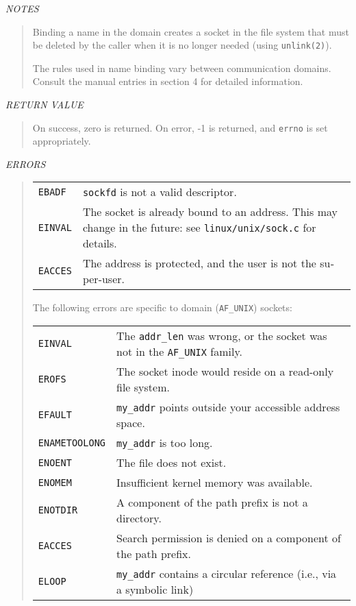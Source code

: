 \begin{appendix}
\begin{english}
{\sl NOTES}
\begin{quote}
	Binding a name in the {\Unix} domain creates a socket in the
	file system that must be deleted by the caller when it is
	no longer needed (using {\tt unlink(2)}).

	The rules used in name binding vary between communication
	domains. Consult the manual entries in section 4 for
	detailed information.
\end{quote}

{\sl RETURN VALUE}
\begin{quote}
	On success, zero is returned. On error, -1 is returned,
	and {\tt errno} is set appropriately.
\end{quote}

{\sl ERRORS}
\begin{quote}
\begin{tabular}{lp{8cm}}
	{\tt EBADF}		& {\tt sockfd} is not a valid descriptor.\\
	{\tt EINVAL}	& The socket is already bound to an address. This
				may change in the future: see {\tt linux/unix/sock.c}
				for details.\\
	{\tt EACCES}	& The address is protected, and the user is not the
				super-user.
\end{tabular}

	The following errors are specific to {\Unix} domain ({\tt AF\_UNIX})
	sockets:\\
\begin{tabular}{lp{8cm}}
	{\tt EINVAL}	& The {\tt addr\_len} was wrong, or the socket was not in
			the {\tt AF\_UNIX} family.\\
	{\tt EROFS}		& The socket inode would reside on a read-only file
			system.\\
	{\tt EFAULT}	& {\tt my\_addr} points outside your accessible address
			space.\\
	{\tt ENAMETOOLONG}	& {\tt my\_addr} is too long.\\
	{\tt ENOENT}	& The file does not exist.\\
	{\tt ENOMEM}	& Insufficient kernel memory was available.\\
	{\tt ENOTDIR}	& A component of the path prefix is not a directory.\\
	{\tt EACCES}	& Search permission is denied on a component of the
			path prefix.\\
	{\tt ELOOP}		& {\tt my\_addr} contains a circular reference (i.e., via a
			symbolic link) \\
\end{tabular}
\end{quote}


\end{english}
\end{appendix}
